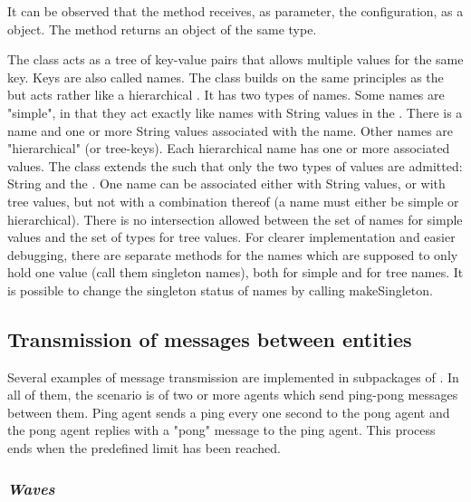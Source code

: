 \documentclass{article}
\begin{document}
It can be observed that the  method receives, as parameter, the configuration, as a  object. The  method returns an object of the same type.

The  class acts as a tree of key-value pairs that allows multiple values for the same key. Keys are also called names.
The class builds on the same principles as the  but acts rather like a hierarchical . It has two types of names.
Some names are "simple", in that they act exactly like names with String values in the . There is a name and one or more String values associated with the name.
Other names are "hierarchical" (or tree-keys). Each hierarchical name has one or more associated  values.
The class extends the  such that only the two types of values are admitted: String and the . One name can be associated either with String values, or with tree values, but not with a combination thereof (a name must either be simple or hierarchical).
There is no intersection allowed between the set of names for simple values and the set of types for tree values.
For clearer implementation and easier debugging, there are separate methods for the names which are supposed to only hold one value (call them singleton names), both for simple and for tree names. It is possible to change the singleton status of names by calling makeSingleton.


\clearpage
\subsection{Transmission of messages between entities}\label{sec:functionality:messages}

Several examples of message transmission are implemented in subpackages of . In all of them, the scenario is of two or more agents which send ping-pong messages between them. Ping agent sends a ping every one second to the pong agent and the pong agent replies with a "pong" message to the ping agent. This process ends when the predefined limit has been reached. %

\subsubsection{\emph{Waves}}\label{sec:functionality:messages:waves}
\end{document}
